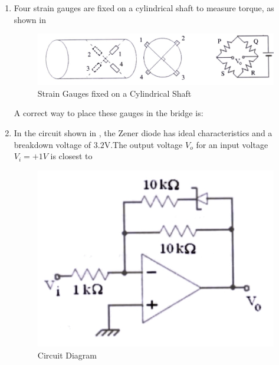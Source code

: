 \documentclass[journal,12pt,onecolumn]{IEEEtran}
\theoremstyle{remark}
\begin{document}
\begin{enumerate}
 
\item Four strain gauges are fixed on a cylindrical shaft to measure torque, as shown in \begin{figure}[H]
    \centering
    \includegraphics[width=0.9\columnwidth]{Figs/Q-32.jpg}
    \caption{Strain Gauges fixed on a Cylindrical Shaft}
    \label{fig:placeholder_8}
\end{figure} 
A correct way to place these gauges in the bridge is: \par \hfill{}
\begin{enumerate}
\end{enumerate}

 

\item In the circuit shown in , the Zener diode has ideal characteristics and a breakdown voltage of $3.2\text{V}$.The output voltage $V_o$ for an input voltage $V_i=+1V$ is closest to \par \hfill{}
\begin{figure}[H]
    \centering
    \includegraphics[width=0.3\columnwidth]{Figs/Q-33.jpg}
    \caption{Circuit Diagram}
    \label{fig:placeholder_9}
\end{figure}
\begin{enumerate}
\end{enumerate} 


\end{enumerate}
\end{document}
